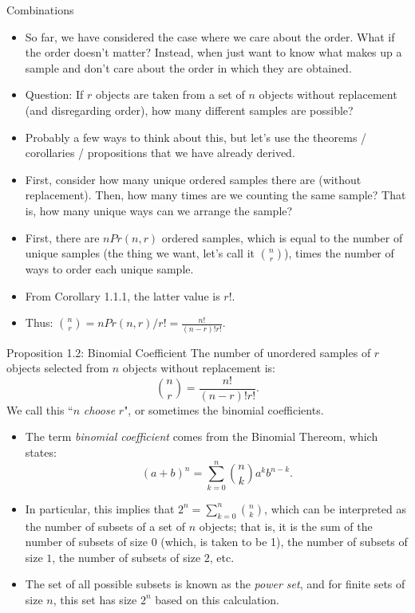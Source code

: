 \begin{frame}[allowframebreaks]{Combinations}

  \begin{itemize}
    \item So far, we have considered the case where we care about the order. What if the order doesn't matter? Instead, when just want to know what makes up a sample and don't care about the order in which they are obtained. 
  
    \item \alert{Question}: If $r$ objects are taken from a set of $n$ objects without replacement (and disregarding order), how many different samples are possible?
  
    \item Probably a few ways to think about this, but let's use the theorems / corollaries / propositions that we have already derived.
    \item First, consider how many unique ordered samples there are (without replacement). Then, how many times are we counting the same sample? That is, how many unique ways can we arrange the sample?
  
  \item First, there are $nPr(n, r)$ ordered samples, which is equal to the number of unique samples (the thing we want, let's call it $\binom{n}{r}$), times the number of ways to order each unique sample. 
  \item From Corollary 1.1.1, the latter value is $r!$. 
  \item Thus: $\binom{n}{r} = nPr(n, r) / r! = \frac{n!}{(n-r)!r!}$.
\end{itemize}

\begin{block}{Proposition 1.2: Binomial Coefficient}
  The number of unordered samples of $r$ objects selected from $n$ objects without replacement is:
  $$
  \binom{n}{r} = \frac{n!}{(n-r)!r!}.
  $$
  We call this ``$n$ \emph{choose} $r$", or sometimes the binomial coefficients.
\end{block}

\begin{itemize}
  \item The term \emph{binomial coefficient} comes from the Binomial Thereom, which states: 
$$
(a + b)^n = \sum_{k = 0}^n \binom{n}{k}a^kb^{n-k}.
$$
  \item In particular, this implies that $2^n = \sum_{k = 0}^n \binom{n}{k}$, which can be interpreted as the number of subsets of a set of $n$ objects; that is, it is the sum of the number of subsets of size $0$ (which, is taken to be 1), the number of subsets of size $1$, the number of subsets of size $2$, etc. 
  \item The set of all possible subsets is known as the \emph{power set}, and for finite sets of size $n$, this set has size $2^n$ based on this calculation.
\end{itemize}
  
\end{frame}

